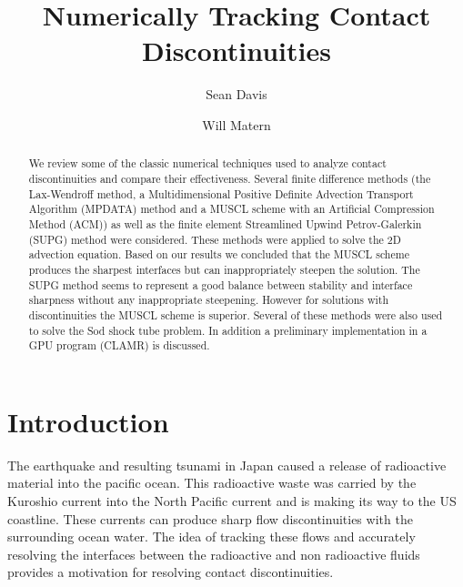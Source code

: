 \documentclass{article}
\begin{document}
\title{Numerically Tracking Contact Discontinuities}
\author{Sean Davis \and Will Matern}
\maketitle

\begin{abstract}
We review some of the classic numerical techniques used to analyze contact discontinuities and compare their effectiveness. Several finite difference methods (the Lax-Wendroff method, a Multidimensional Positive Definite Advection Transport Algorithm (MPDATA) method and a MUSCL scheme with an Artificial Compression Method (ACM)) as well as the finite element Streamlined Upwind Petrov-Galerkin (SUPG) method were considered. These methods were applied to solve the 2D advection equation. Based on our results we concluded that the MUSCL scheme produces the sharpest interfaces but can inappropriately steepen the solution. The SUPG method seems to represent a good balance between stability and interface sharpness without any inappropriate steepening. However for solutions with discontinuities the MUSCL scheme is superior. Several of these methods were also used to solve the Sod shock tube problem. In addition a preliminary implementation in a GPU program (CLAMR) is discussed.
\end{abstract}

\section{Introduction}
\label{intro}

The earthquake and resulting tsunami in Japan caused a release of radioactive material into the pacific ocean. This radioactive waste was carried by the Kuroshio current into the North Pacific current and is making its way to the US coastline. These currents can produce sharp flow discontinuities with the surrounding ocean water. The idea of tracking these flows and accurately resolving the  interfaces between the radioactive and non radioactive fluids provides a motivation for resolving contact discontinuities.
\end{document}
